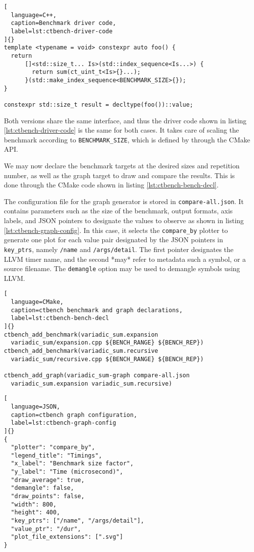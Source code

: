 \documentclass[../main]{subfiles}
\begin{document}
\begin{lstlisting}[
  language=C++,
  caption=Benchmark driver code,
  label=lst:ctbench-driver-code
]{}
template <typename = void> constexpr auto foo() {
  return
      []<std::size_t... Is>(std::index_sequence<Is...>) {
        return sum(ct_uint_t<Is>{}...);
      }(std::make_index_sequence<BENCHMARK_SIZE>{});
}

constexpr std::size_t result = decltype(foo())::value;
\end{lstlisting}

Both versions share the same interface, and thus the driver code shown in
listing \ref{lst:ctbench-driver-code} is the same for both cases.
It takes care of scaling the benchmark according to \lstinline{BENCHMARK_SIZE},
which is defined by \ctbench through the CMake API.

We may now declare the benchmark targets at the desired sizes and
repetition number, as well as the graph target to draw and compare the results.
This is done through the CMake code shown in listing
\ref{lst:ctbench-bench-decl}.

The configuration file for the graph generator is stored in
\lstinline{compare-all.json}.
It contains parameters such as the size of the benchmark, output formats,
axis labels, and JSON pointers to designate the values to observe as shown in
listing \ref{lst:ctbench-graph-config}.
In this case, it selects the \lstinline{compare_by} plotter to generate one
plot for each value pair designated by the JSON pointers in
\lstinline{key_ptrs}, namely \lstinline{/name} and \lstinline{/args/detail}.
The first pointer designates the LLVM timer name, and the second *may* refer to
metadata such a \cpp symbol, or a \cpp source filename. The \lstinline{demangle}
option may be used to demangle \cpp symbols using LLVM.

\begin{lstlisting}[
  language=CMake,
  caption=ctbench benchmark and graph declarations,
  label=lst:ctbench-bench-decl
]{}
ctbench_add_benchmark(variadic_sum.expansion
  variadic_sum/expansion.cpp ${BENCH_RANGE} ${BENCH_REP})
ctbench_add_benchmark(variadic_sum.recursive
  variadic_sum/recursive.cpp ${BENCH_RANGE} ${BENCH_REP})

ctbench_add_graph(variadic_sum-graph compare-all.json
  variadic_sum.expansion variadic_sum.recursive)
\end{lstlisting}

\clearpage%

\begin{lstlisting}[
  language=JSON,
  caption=ctbench graph configuration,
  label=lst:ctbench-graph-config
]{}
{
  "plotter": "compare_by",
  "legend_title": "Timings",
  "x_label": "Benchmark size factor",
  "y_label": "Time (microsecond)",
  "draw_average": true,
  "demangle": false,
  "draw_points": false,
  "width": 800,
  "height": 400,
  "key_ptrs": ["/name", "/args/detail"],
  "value_ptr": "/dur",
  "plot_file_extensions": [".svg"]
}
\end{lstlisting}
\end{document}
